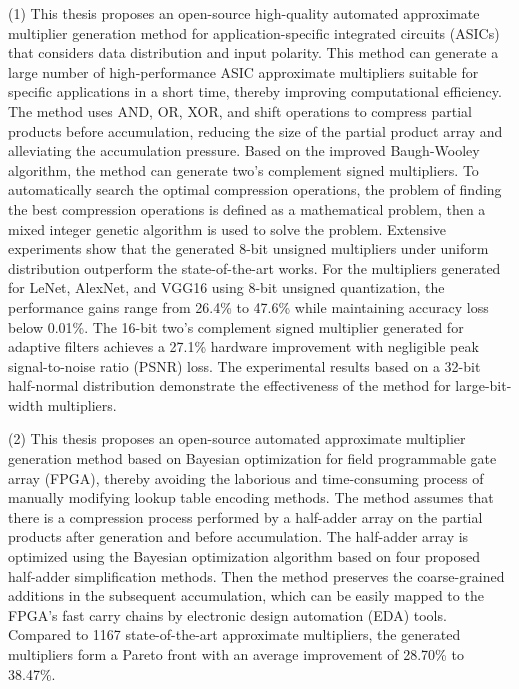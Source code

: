 \begin{abstract*}
      (1) This thesis proposes an open-source high-quality automated approximate multiplier generation method for application-specific integrated circuits (ASICs) that considers data distribution and input polarity. This method can generate a large number of high-performance ASIC approximate multipliers suitable for specific applications in a short time, thereby improving computational efficiency. The method uses AND, OR, XOR, and shift operations to compress partial products before accumulation, reducing the size of the partial product array and alleviating the accumulation pressure. Based on the improved Baugh-Wooley algorithm, the method can generate two's complement signed multipliers. To automatically search the optimal compression operations, the problem of finding the best compression operations is defined as a mathematical problem, then a mixed integer genetic algorithm is used to solve the problem. Extensive experiments show that the generated 8-bit unsigned multipliers under uniform distribution outperform the state-of-the-art works. For the multipliers generated for LeNet, AlexNet, and VGG16 using 8-bit unsigned quantization, the performance gains range from 26.4\% to 47.6\% while maintaining accuracy loss below 0.01\%. The 16-bit two's complement signed multiplier generated for adaptive filters achieves a 27.1\% hardware improvement with negligible peak signal-to-noise ratio (PSNR) loss. The experimental results based on a 32-bit half-normal distribution demonstrate the effectiveness of the method for large-bit-width multipliers.
    
      (2) This thesis proposes an open-source automated approximate multiplier generation method based on Bayesian optimization for field programmable gate array (FPGA), thereby avoiding the laborious and time-consuming process of manually modifying lookup table encoding methods. The method assumes that there is a compression process performed by a half-adder array on the partial products after generation and before accumulation.
      The half-adder array is optimized using the Bayesian optimization algorithm based on four proposed half-adder simplification methods. Then the method preserves the coarse-grained additions in the subsequent accumulation, which can be easily mapped to the FPGA's fast carry chains by electronic design automation (EDA) tools.
      Compared to 1167 state-of-the-art approximate multipliers, the generated multipliers form a Pareto front with an average improvement of 28.70\% to 38.47\%.
    

\end{abstract*}

